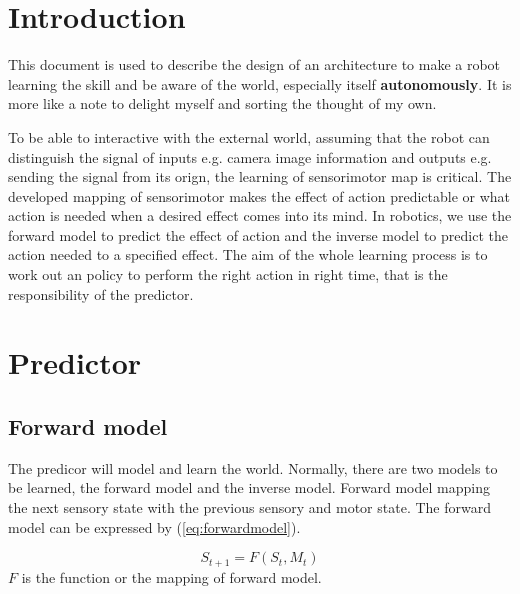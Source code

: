 \documentclass{article}
\begin{document}
\section{Introduction}


\label{sec:intro}
This document is used to describe the design of an architecture to make a robot learning the skill and be aware of the world, especially itself \textbf{autonomously}. It is more like a note to delight myself and sorting the thought of my own.

To be able to interactive with the external world, assuming that the robot can distinguish the signal of inputs e.g. camera image information and outputs e.g. sending the signal from its orign, the learning of sensorimotor map is critical. The developed mapping of sensorimotor makes the effect of action predictable or what action is needed when a desired effect comes into its mind. In robotics, we use the forward model to predict the effect of action and the inverse model to predict the action needed to a specified effect. The aim of the whole learning process is to work out an policy to perform the right action in right time, that is the responsibility of the predictor.

\section{Predictor}
\label{sec:predictor}

\subsection{Forward model}
\label{sec:forwardmodel}
The predicor will model and learn the world. Normally, there are two models to be learned, the forward model and the inverse model. Forward model mapping the next sensory state with the previous sensory and motor state. The forward model can be expressed by (\ref{eq:forwardmodel}).


\begin{equation}
  \label{eq:forwardmodel}
  S_{t+1} = F(S_t, M_t)
\end{equation}
$F$ is the function or the mapping of forward model.
\end{document}
